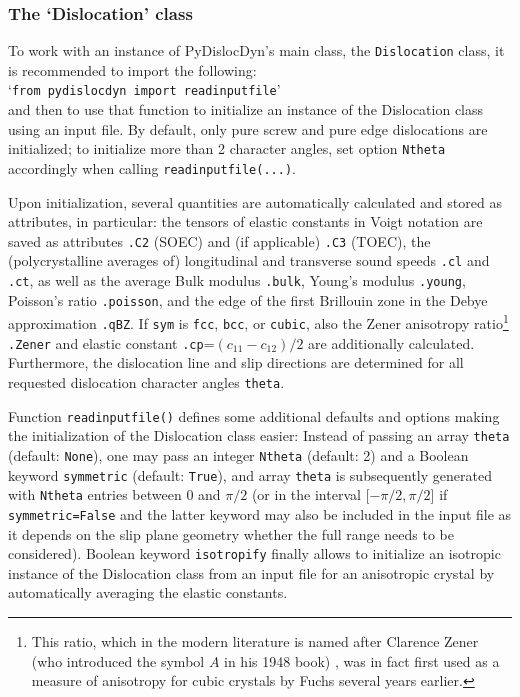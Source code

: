\documentclass[11pt,letterpaper,oneside]{article}
\begin{document}
\subsubsection{The `Dislocation' class}
\label{sec:Dislocation}

To work with an instance of PyDislocDyn's main class, the \verb|Dislocation| class, it is recommended to import the following:
\\`\verb|from pydislocdyn import readinputfile|'\\
and then to use that function to initialize an instance of the Dislocation class using an input file.
By default, only pure screw and pure edge dislocations are initialized; to initialize more than 2 character angles, set option \verb|Ntheta| accordingly when calling \verb|readinputfile(...)|.

Upon initialization, several quantities are automatically calculated and stored as attributes, in particular:
the tensors of elastic constants in Voigt notation are saved as attributes \verb|.C2| (SOEC) and (if applicable) \verb|.C3| (TOEC),
the (polycrystalline averages of) longitudinal and transverse sound speeds \verb|.cl| and \verb|.ct|, as well as the average Bulk modulus \verb|.bulk|, Young's modulus \verb|.young|, Poisson's ratio \verb|.poisson|,
and the edge of the first Brillouin zone in the Debye approximation \verb|.qBZ|.
If \verb|sym| is \verb|fcc|, \verb|bcc|, or \verb|cubic|, also the Zener anisotropy ratio\footnote{%
This ratio, which in the modern literature is named after Clarence Zener (who introduced the symbol $A$ in his 1948 book) \cite{Zener:1948}, was in fact first used as a measure of anisotropy for cubic crystals by Fuchs \cite{Fuchs:1936} several years earlier.}
\verb|.Zener| and elastic constant \verb|.cp|=$(c_{11}-c_{12})/2$ are additionally calculated.
Furthermore, the dislocation line and slip directions are determined for all requested dislocation character angles \verb|theta|.

Function \verb|readinputfile()| defines some additional defaults and options making the initialization of the Dislocation class easier:
Instead of passing an array \verb|theta| (default: \verb|None|), one may pass an integer \verb|Ntheta| (default: 2) and a Boolean keyword \verb|symmetric| (default: \verb|True|), and array \verb|theta| is subsequently generated with \verb|Ntheta| entries between 0 and $\pi/2$ (or in the interval [$-\pi/2,\pi/2$] if \verb|symmetric=False| and the latter keyword may also be included in the input file as it depends on the slip plane geometry whether the full range needs to be considered).
Boolean keyword \verb|isotropify| finally allows to initialize an isotropic instance of the Dislocation class from an input file for an anisotropic crystal by automatically averaging the elastic constants.
\end{document}
